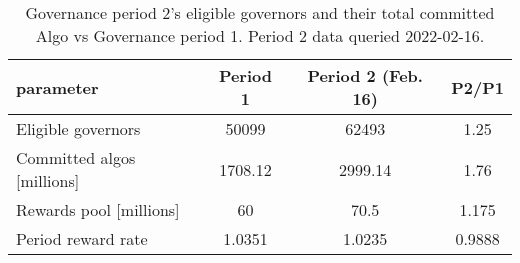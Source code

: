 %
\begin{longtable}[c]{ l c c c }
\caption{Governance period 2's eligible governors and their total committed Algo vs Governance period 1. Period 2 data queried 2022-02-16.} \\
\hline
\textbf{parameter} & \textbf{Period 1} & \textbf{Period 2 (Feb. 16)} & \textbf{P2/P1} \\
\hline

Eligible governors & 50099 & 62493 & 1.25 \\
Committed algos [millions] & 1708.12 & 2999.14 & 1.76 \\
Rewards pool [millions] & 60 & 70.5 & 1.175 \\
Period reward rate & 1.0351 & 1.0235 & 0.9888 \\
\hline
\end{longtable} 
